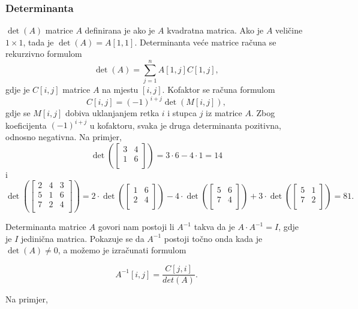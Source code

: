 \subsubsection{Determinanta}


 $\det(A)$ matrice $A$
definirana je ako je $A$ kvadratna matrica.
Ako je $A$ veličine $1 \times 1$,
tada je $\det(A)=A[1,1]$.
Determinanta veće matrice
računa se rekurzivno formulom 
\[\det(A)=\sum_{j=1}^n A[1,j] C[1,j],\]
gdje je $C[i,j]$  matrice $A$
na mjestu $[i,j]$.
Kofaktor se računa formulom
\[C[i,j] = (-1)^{i+j} \det(M[i,j]),\]
gdje se $M[i,j]$ dobiva uklanjanjem
retka $i$ i stupca $j$ iz matrice $A$.
Zbog koeficijenta $(-1)^{i+j}$ u kofaktoru,
svaka je druga determinanta pozitivna,
odnosno negativna.
Na primjer,
\[
\det(
 \begin{bmatrix}
  3 & 4 \\
  1 & 6 \\
 \end{bmatrix}
) = 3 \cdot 6 - 4 \cdot 1 = 14 
\]
i
\[
\det(
 \begin{bmatrix}
  2 & 4 & 3 \\
  5 & 1 & 6 \\
  7 & 2 & 4 \\
 \end{bmatrix}
) = 
2 \cdot
\det(
 \begin{bmatrix}
  1 & 6 \\
  2 & 4 \\
 \end{bmatrix}
)
-4 \cdot
\det(
 \begin{bmatrix}
  5 & 6 \\
  7 & 4 \\
 \end{bmatrix}
)
+3 \cdot
\det(
 \begin{bmatrix}
  5 & 1 \\
  7 & 2 \\
 \end{bmatrix}
) = 81.
\]


Determinanta matrice $A$ govori nam
postoji li 
$A^{-1}$ takva da je $A \cdot A^{-1} = I$,
gdje je $I$ jedinična matrica.
Pokazuje se da $A^{-1}$ postoji
točno onda kada je $\det(A) \neq 0$,
a možemo je izračunati formulom

\[A^{-1}[i,j] = \frac{C[j,i]}{det(A)}.\]

Na primjer,

